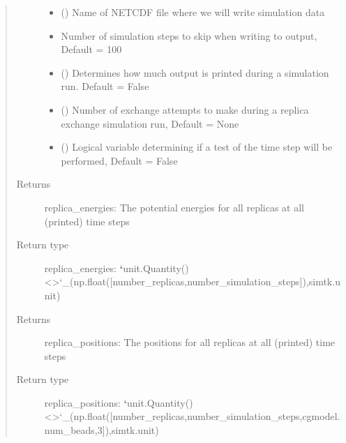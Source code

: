 \documentclass[letterpaper,12pt,english,openany,oneside]{sphinxmanual}
\begin{document}
\begin{fulllineitems}
\begin{quote}
\begin{description}
\begin{itemize}
\item {} 
 () \textendash{} Name of NETCDF file where we will write simulation data

\item {} 
 \textendash{} Number of simulation steps to skip when writing to output, Default = 100

\item {} 
 () \textendash{} Determines how much output is printed during a simulation run.  Default = False

\item {} 
 () \textendash{} Number of exchange attempts to make during a replica exchange simulation run, Default = None

\item {} 
 () \textendash{} Logical variable determining if a test of the time step will be performed, Default = False

\end{itemize}

\item[{Returns}] \leavevmode
replica\_energies: The potential energies for all replicas at all (printed) time steps

\item[{Return type}] \leavevmode
replica\_energies: {\color{red}\bfseries{}{}`}unit.Quantity() \textless{}\textgreater{}{}`\_(np.float({[}number\_replicas,number\_simulation\_steps{]}),simtk.unit)

\item[{Returns}] \leavevmode
replica\_positions: The positions for all replicas at all (printed) time steps

\item[{Return type}] \leavevmode
replica\_positions: {\color{red}\bfseries{}{}`}unit.Quantity() \textless{}\textgreater{}{}`\_(np.float({[}number\_replicas,number\_simulation\_steps,cgmodel.num\_beads,3{]}),simtk.unit)


\end{description}
\end{quote}
\end{fulllineitems}
\end{document}
